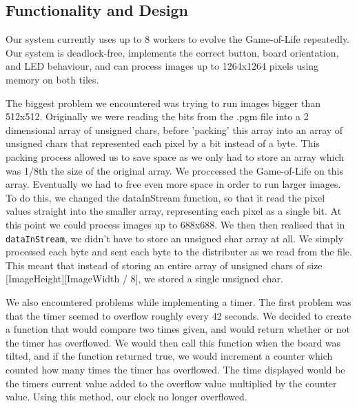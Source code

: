 \documentclass{article}
\begin{document}
\begin{multicols}{2}

\section{Functionality and Design}
Our system currently uses up to 8 workers to evolve the Game-of-Life repeatedly. Our system is
deadlock-free, implements the correct button, board orientation, and LED behaviour, and can process
images up to 1264x1264 pixels using memory on both tiles.

\vspace{5mm}

The biggest problem we encountered was trying to run images bigger than 512x512. Originally we were
reading the bits from the .pgm file into a 2 dimensional array of unsigned chars, before 'packing'
this array into an array of unsigned chars that represented each pixel by a bit instead of a byte.
This packing process allowed us to save space as we only had to store an array which was 1/8th the
size of the original array. We proccessed the Game-of-Life on this array. Eventually we had to
free even more space in order to run larger images. To do this, we changed the dataInStream function,
so that it read the pixel values straight into the smaller array, representing each pixel as a
single bit. At this point we could process images up to 688x688. We then then realised that in
\texttt{dataInStream}, we didn't have to store an unsigned char array at all. We simply processed
each byte and sent each byte to the distributer as we read from the file. This meant that instead
of storing an entire array of unsigned chars of size [ImageHeight][ImageWidth / 8], we stored a single
unsigned char.

\vspace{5mm}

We also encountered problems while implementing a timer. The first problem was that the timer seemed
to overflow roughly every 42 seconds. We decided to create a function that would compare two times
given, and would return whether or not the timer has overflowed. We would then call this function when
the board was tilted, and if the function returned true, we would increment a counter which counted
how many times the timer has overflowed. The time displayed would be the timers current value added
to the overflow value multiplied by the counter value. Using this method, our clock no longer
overflowed.

\vspace{5mm}


\end{multicols}
\end{document}
